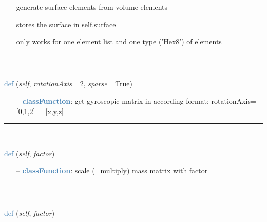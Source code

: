 \begin{itemize}[leftmargin=1.4cm]
\begin{itemize}[leftmargin=0.5cm]
\begin{itemize}[leftmargin=1.4cm]
\begin{itemize}[leftmargin=0.5cm]
\begin{itemize}[leftmargin=0.7cm]
\begin{itemize}[leftmargin=1.2cm]
\setlength{\itemindent}{-0.7cm}
    \item[] generate surface elements from volume elements
    \item[] stores the surface in self.surface
    \item[] only works for one element list and one type ('Hex8') of elements
  \end{itemize}
\vspace{12pt}\end{itemize}
%
\noindent\rule{8cm}{0.75pt}\vspace{1pt} \\ 
\begin{flushleft}
\noindent \textcolor{steelblue}{def {\bf {}}}\label{sec:FEM:FEMinterface:GetGyroscopicMatrix}
({\it self}, {\it rotationAxis}= 2, {\it sparse}= True)
\end{flushleft}
\setlength{\itemindent}{0.7cm}
\begin{itemize}[leftmargin=0.7cm]
  \item[--]  \textcolor{steelblue}{\bf classFunction}: get gyroscopic matrix in according format; rotationAxis=[0,1,2] = [x,y,z]\vspace{12pt}\end{itemize}
%
\noindent\rule{8cm}{0.75pt}\vspace{1pt} \\ 
\begin{flushleft}
\noindent \textcolor{steelblue}{def {\bf {}}}\label{sec:FEM:FEMinterface:ScaleMassMatrix}
({\it self}, {\it factor})
\end{flushleft}
\setlength{\itemindent}{0.7cm}
\begin{itemize}[leftmargin=0.7cm]
  \item[--]  \textcolor{steelblue}{\bf classFunction}: scale (=multiply) mass matrix with factor\vspace{12pt}\end{itemize}
%
\noindent\rule{8cm}{0.75pt}\vspace{1pt} \\ 
\begin{flushleft}
\noindent \textcolor{steelblue}{def {\bf {}}}\label{sec:FEM:FEMinterface:ScaleStiffnessMatrix}
({\it self}, {\it factor})

\end{flushleft}
\end{itemize}
\end{itemize}
\end{itemize}
\end{itemize}
